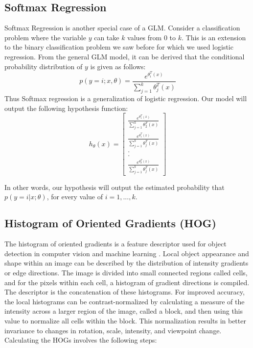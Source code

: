 \documentclass[twoside]{article}
\begin{document}
\subsection {Softmax Regression}
Softmax Regression is another special case of a GLM. Consider a classification problem where the variable $y$ can take $k$ values from $0$ to $k$. This is an extension to the binary classification problem we saw before for which we used logistic regression. From the general GLM model, it can be derived that the conditional probability distribution of $y$ is given as follows: \\

\[p(y=i;x,\theta) = \frac{e^{\theta_i^T(x)}}{\sum_{j=1}^k\theta_j^T(x)}\]
Thus Softmax regression is a generalization of logistic regression. Our model will output the following hypothesis function:
\[h_{\theta}(x) = \begin{bmatrix}\frac{e^{\theta_1^T(x)}}{\sum_{j=1}^k\theta_2^T(x)}\\\frac{e^{\theta_1^T(x)}}{\sum_{j=1}^k\theta_j^T(x)} \\
.\\
.\\
\frac{e^{\theta_k^T(x)}}{\sum_{j=1}^k\theta_j^T(x)} \end{bmatrix}\]

In other words, our hypothesis will output the estimated probability that $p(y = i|x; θ)$, for every value of $i = 1, . . . , k$.



\subsection{Histogram of Oriented Gradients (HOG)}
The histogram of oriented gradients is a feature descriptor used for object detection in computer vision and machine learning \cite{wikipedia_2017}.
Local object appearance and shape within an image can be described by the distribution of intensity gradients or edge directions. The image is divided into small connected regions called cells, and for the pixels within each cell, a histogram of gradient directions is compiled. The descriptor is the concatenation of these histograms. For improved accuracy, the local histograms can be contrast-normalized by calculating a measure of the intensity across a larger region of the image, called a block, and then using this value to normalize all cells within the block. This normalization results in better invariance to changes in rotation, scale, intensity, and viewpoint change.
Calculating the HOGs involves the following steps: \\
\end{document}
